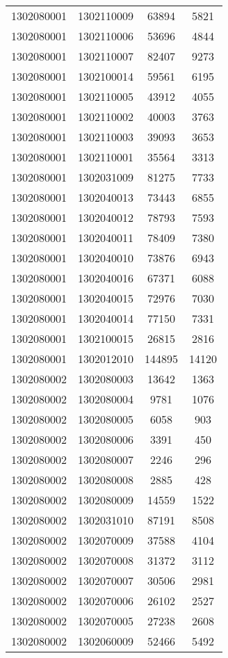 \begin{longtable}[h]{llcc}
		1302080001 & 1302110009 & 63894 & 5821\\
		1302080001 & 1302110006 & 53696 & 4844\\
		1302080001 & 1302110007 & 82407 & 9273\\
		1302080001 & 1302100014 & 59561 & 6195\\
		1302080001 & 1302110005 & 43912 & 4055\\
		1302080001 & 1302110002 & 40003 & 3763\\
		1302080001 & 1302110003 & 39093 & 3653\\
		1302080001 & 1302110001 & 35564 & 3313\\
		1302080001 & 1302031009 & 81275 & 7733\\
		1302080001 & 1302040013 & 73443 & 6855\\
		1302080001 & 1302040012 & 78793 & 7593\\
		1302080001 & 1302040011 & 78409 & 7380\\
		1302080001 & 1302040010 & 73876 & 6943\\
		1302080001 & 1302040016 & 67371 & 6088\\
		1302080001 & 1302040015 & 72976 & 7030\\
		1302080001 & 1302040014 & 77150 & 7331\\
		1302080001 & 1302100015 & 26815 & 2816\\
		1302080001 & 1302012010 & 144895 & 14120\\
		1302080002 & 1302080003 & 13642 & 1363\\
		1302080002 & 1302080004 & 9781 & 1076\\
		1302080002 & 1302080005 & 6058 & 903\\
		1302080002 & 1302080006 & 3391 & 450\\
		1302080002 & 1302080007 & 2246 & 296\\
		1302080002 & 1302080008 & 2885 & 428\\
		1302080002 & 1302080009 & 14559 & 1522\\
		1302080002 & 1302031010 & 87191 & 8508\\
		1302080002 & 1302070009 & 37588 & 4104\\
		1302080002 & 1302070008 & 31372 & 3112\\
		1302080002 & 1302070007 & 30506 & 2981\\
		1302080002 & 1302070006 & 26102 & 2527\\
		1302080002 & 1302070005 & 27238 & 2608\\
		1302080002 & 1302060009 & 52466 & 5492\\

\end{longtable}
